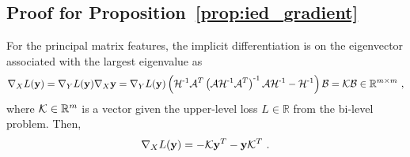 \subsection{Proof for Proposition~\ref{prop:ied_gradient}}
For the principal matrix features, the implicit differentiation is on the eigenvector associated with the largest eigenvalue as
%
\begin{equation}
\nabla_X L(\mathbf{y})
= \nabla_Y L(\mathbf{y}) \nabla_X \mathbf{y}
= \nabla_Y L(\mathbf{y}) 
\left( \mathcal{H}^{\text{-}1} \mathcal{A}^{T} \left( \mathcal{A} \mathcal{H}^{\text{-}1} \mathcal{A}^T \right)^{\text{-}1} \mathcal{A} \mathcal{H}^{\text{-}1} - \mathcal{H}^{\text{-}1} \right) \mathcal{B}
= \mathcal{K} \mathcal{B} \in \mathbb{R}^{m \times m}\ ,
\end{equation}
%
where $\mathcal{K} \in \mathbb{R}^{m}$ is a vector given the upper-level loss $L \in \mathbb{R}$ from the bi-level problem.
Then,
%
\begin{equation}
\label{eq:prop_34_app}
\nabla_X L(\mathbf{y}) = -\mc{K} \mathbf{y}^T - \mathbf{y} \mc{K}^T\ .
\end{equation}

